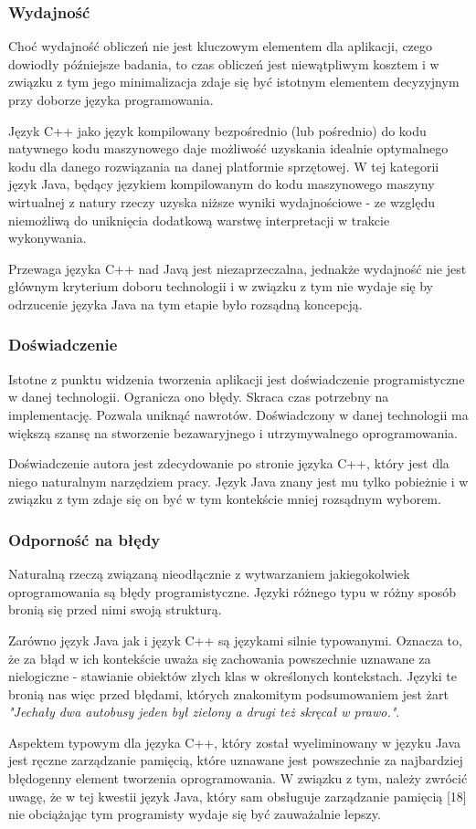 {\subsubsection{Wydajność}
\par{
Choć wydajność obliczeń nie jest kluczowym elementem dla aplikacji, czego dowiodły późniejsze badania, to czas obliczeń jest niewątpliwym kosztem i w związku z tym jego minimalizacja zdaje się być istotnym elementem decyzyjnym przy doborze języka programowania.
}
\par{
Język C++ jako język kompilowany bezpośrednio (lub pośrednio) do kodu natywnego kodu maszynowego daje możliwość uzyskania idealnie optymalnego kodu dla danego rozwiązania na danej platformie sprzętowej. W tej kategorii język Java, będący językiem kompilowanym do kodu maszynowego maszyny wirtualnej z natury rzeczy uzyska niższe wyniki wydajnościowe - ze względu niemożliwą do uniknięcia dodatkową warstwę interpretacji w trakcie wykonywania.
}
\par{
Przewaga języka C++ nad Javą jest niezaprzeczalna, jednakże wydajność nie jest głównym kryterium doboru technologii i w związku z tym nie wydaje się by odrzucenie języka Java na tym etapie było rozsądną koncepcją.
}
\subsubsection{Doświadczenie}
\par{
Istotne z punktu widzenia tworzenia aplikacji jest doświadczenie programistyczne w danej technologii. Ogranicza ono błędy. Skraca czas potrzebny na implementację. Pozwala uniknąć nawrotów. Doświadczony w danej technologii ma większą szansę na stworzenie bezawaryjnego i utrzymywalnego oprogramowania.
}
\par{
Doświadczenie autora jest zdecydowanie po stronie języka C++, który jest dla niego naturalnym narzędziem pracy. Język Java znany jest mu tylko pobieżnie i w związku z tym zdaje się on być w tym kontekście mniej rozsądnym wyborem.
}
\subsubsection{Odporność na błędy}
\par{
Naturalną rzeczą związaną nieodłącznie z wytwarzaniem jakiegokolwiek oprogramowania są błędy programistyczne. Języki różnego typu w różny sposób bronią się przed nimi swoją strukturą.
}
\par{
Zarówno język Java jak i język C++ są językami silnie typowanymi. Oznacza to, że za błąd w ich kontekście uważa się zachowania powszechnie uznawane za nielogiczne - stawianie obiektów złych klas w określonych kontekstach. Języki te bronią nas więc przed błędami, których znakomitym podsumowaniem jest żart \textit{"Jechały dwa autobusy jeden był zielony a drugi też skręcał w prawo."}.
}
\par{
Aspektem typowym dla języka C++, który został wyeliminowany w języku Java jest ręczne zarządzanie pamięcią, które uznawane jest powszechnie za najbardziej błędogenny element tworzenia oprogramowania. W związku z tym, należy zwrócić uwagę, że w tej kwestii język Java, który sam obsługuje zarządzanie pamięcią [18] nie obciążając tym programisty wydaje się być zauważalnie lepszy.
}
}

